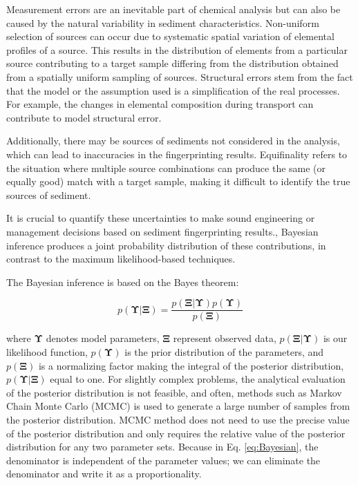 Measurement errors are an inevitable part of chemical analysis but can also be caused by the natural variability in sediment characteristics. Non-uniform selection of sources can occur due to systematic spatial variation of elemental profiles of a source. This results in the distribution of elements from a particular source contributing to a target sample differing from the distribution obtained from a spatially uniform sampling of sources. Structural errors stem from the fact that the model or the assumption used is a simplification of the real processes. For example, the changes in elemental composition during transport can contribute to model structural error.

Additionally, there may be sources of sediments not considered in the analysis, which can lead to inaccuracies in the fingerprinting results. Equifinality refers to the situation where multiple source combinations can produce the same (or equally good) match with a target sample, making it difficult to identify the true sources of sediment.

It is crucial to quantify these uncertainties to make sound engineering or management decisions based on sediment fingerprinting results., Bayesian inference produces a joint probability distribution of these contributions, in contrast to the maximum likelihood-based techniques.

The Bayesian inference is based on the Bayes theorem:

\begin{equation}\label{eq:Bayesian}
    p(\mathbf{\Upsilon}|\mathbf{\Xi}) = \frac{p(\mathbf{\Xi}|\mathbf{\Upsilon})p(\mathbf{\Upsilon})}{p(\mathbf{\Xi})}
\end{equation}

where $\mathbf{\Upsilon}$ denotes model parameters, $\mathbf{\Xi}$ represent observed data, $p(\mathbf{\Xi}|\mathbf{\Upsilon})$ is our likelihood function, $p(\mathbf{\Upsilon})$ is the prior distribution of the parameters, and $p(\mathbf{\Xi})$ is a normalizing factor making the integral of the posterior distribution, $p(\mathbf{\Upsilon}|\mathbf{\Xi})$ equal to one. For slightly complex problems, the analytical evaluation of the posterior distribution is not feasible, and often, methods such as Markov Chain Monte Carlo (MCMC) is used to generate a large number of samples from the posterior distribution. MCMC method does not need to use the precise value of the posterior distribution and only requires the relative value of the posterior distribution for any two parameter sets. Because in Eq. \eqref{eq:Bayesian}, the denominator is independent of the parameter values; we can eliminate the denominator and write it as a proportionality.     

